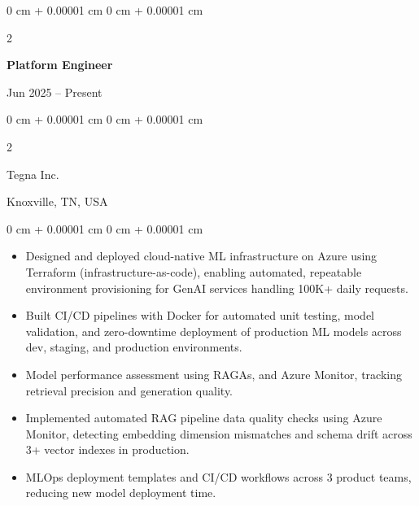 \documentclass[10pt, letterpaper]{article}
\newenvironment{highlights}{
    \begin{itemize}[
        topsep=0.10 cm,
        parsep=0.10 cm,
        partopsep=0pt,
        itemsep=0pt,
        leftmargin=0 cm + 10pt
    ]
}{
    \end{itemize}
} %
\newenvironment{onecolentry}{
    \begin{adjustwidth}{
        0 cm + 0.00001 cm
    }{
        0 cm + 0.00001 cm
    }
}{
    \end{adjustwidth}
} %
\newenvironment{twocolentry}[2][]{
    \onecolentry
    \def\secondColumn{#2}
    \setcolumnwidth{\fill, 4.5 cm}
    \begin{paracol}{2}
}{
    \switchcolumn \raggedleft \secondColumn
    \end{paracol}
    \endonecolentry
} %
\begin{document}
    \begin{twocolentry}{Jun 2025 -- Present}
        \textbf{Platform Engineer}
    \end{twocolentry}
    \begin{twocolentry}{Knoxville, TN, USA}
       Tegna Inc.
    \end{twocolentry}
    
    \begin{onecolentry}
        \begin{highlights}
            \item Designed and deployed cloud-native ML infrastructure on Azure using Terraform (infrastructure-as-code), enabling automated, repeatable environment provisioning for GenAI services handling 100K+ daily requests.
            \item Built CI/CD pipelines with Docker for automated unit testing, model validation, and zero-downtime deployment of production ML models across dev, staging, and production environments.
            \item Model performance assessment using RAGAs, and Azure Monitor, tracking retrieval precision and generation quality.
            \item Implemented automated RAG pipeline data quality checks using Azure Monitor, detecting embedding dimension mismatches and schema drift across 3+ vector indexes in production.
            \item MLOps deployment templates and CI/CD workflows across 3 product teams, reducing new model deployment time.
        \end{highlights}
    \end{onecolentry}

\vspace{1mm}
    
\end{document}
